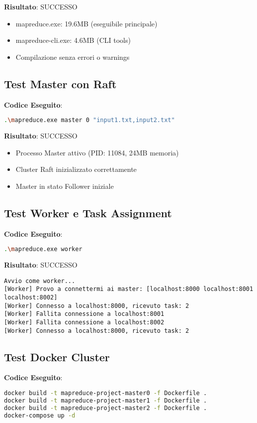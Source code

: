 \documentclass[12pt,a4paper]{article}
\begin{document}
\textbf{Risultato}: SUCCESSO
\begin{itemize}
\item mapreduce.exe: 19.6MB (eseguibile principale)
\item mapreduce-cli.exe: 4.6MB (CLI tools)
\item Compilazione senza errori o warnings
\end{itemize}

\subsection{Test Master con Raft}

\textbf{Codice Eseguito}:
\begin{lstlisting}[language=bash]
.\mapreduce.exe master 0 "input1.txt,input2.txt"
\end{lstlisting}

\textbf{Risultato}: SUCCESSO
\begin{itemize}
\item Processo Master attivo (PID: 11084, 24MB memoria)
\item Cluster Raft inizializzato correttamente
\item Master in stato Follower iniziale
\end{itemize}

\subsection{Test Worker e Task Assignment}

\textbf{Codice Eseguito}:
\begin{lstlisting}[language=bash]
.\mapreduce.exe worker
\end{lstlisting}

\textbf{Risultato}: SUCCESSO
\begin{lstlisting}
Avvio come worker...
[Worker] Provo a connettermi ai master: [localhost:8000 localhost:8001 localhost:8002]
[Worker] Connesso a localhost:8000, ricevuto task: 2
[Worker] Fallita connessione a localhost:8001
[Worker] Fallita connessione a localhost:8002
[Worker] Connesso a localhost:8000, ricevuto task: 2
\end{lstlisting}

\subsection{Test Docker Cluster}

\textbf{Codice Eseguito}:
\begin{lstlisting}[language=bash]
docker build -t mapreduce-project-master0 -f Dockerfile .
docker build -t mapreduce-project-master1 -f Dockerfile .
docker build -t mapreduce-project-master2 -f Dockerfile .
docker-compose up -d
\end{lstlisting}
\end{document}
